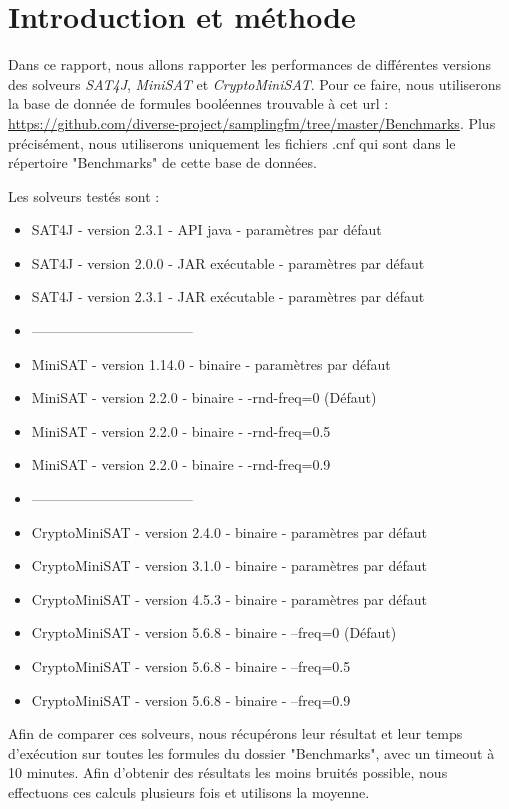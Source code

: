 \documentclass[11pt,a4paper]{article}
\author{Théo Gouzien - Théo Losekoot}
\begin{document}
\section{Introduction et méthode}

Dans ce rapport, nous allons rapporter les performances de différentes versions des solveurs \textit{SAT4J}, \textit{MiniSAT} et \textit{CryptoMiniSAT}.
Pour ce faire, nous utiliserons la base de donnée de formules booléennes trouvable à cet url : \url{https://github.com/diverse-project/samplingfm/tree/master/Benchmarks}.
Plus précisément, nous utiliserons uniquement les fichiers .cnf qui sont dans le répertoire "Benchmarks" de cette base de données.

Les solveurs testés sont : 
\begin{itemize}
\item SAT4J - version 2.3.1 - API java - paramètres par défaut
\item SAT4J - version 2.0.0 - JAR exécutable - paramètres par défaut
\item SAT4J - version 2.3.1 - JAR exécutable - paramètres par défaut 
\item -----------------------------------
\item MiniSAT - version 1.14.0 - binaire - paramètres par défaut
\item MiniSAT - version 2.2.0  - binaire - -rnd-freq=0 (Défaut)
\item MiniSAT - version 2.2.0  - binaire - -rnd-freq=0.5
\item MiniSAT - version 2.2.0  - binaire - -rnd-freq=0.9
\item -----------------------------------
\item CryptoMiniSAT - version 2.4.0 - binaire - paramètres par défaut
\item CryptoMiniSAT - version 3.1.0 - binaire - paramètres par défaut
\item CryptoMiniSAT - version 4.5.3 - binaire - paramètres par défaut
\item CryptoMiniSAT - version 5.6.8 - binaire - --freq=0 (Défaut)
\item CryptoMiniSAT - version 5.6.8 - binaire - --freq=0.5
\item CryptoMiniSAT - version 5.6.8 - binaire - --freq=0.9
\end{itemize}

Afin de comparer ces solveurs, nous récupérons leur résultat et leur temps d'exécution sur toutes les formules du dossier "Benchmarks", avec un timeout à 10 minutes. 
Afin d'obtenir des résultats les moins bruités possible, nous effectuons ces calculs plusieurs fois et utilisons la moyenne.
\end{document}
